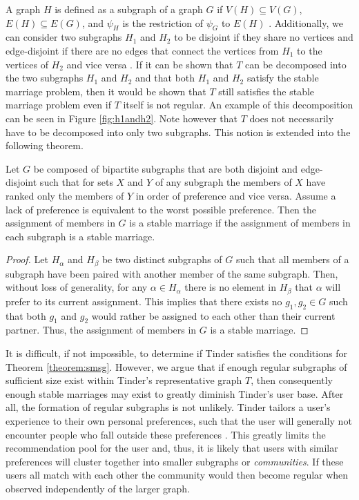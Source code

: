 A graph $H$ is defined as a subgraph of a graph $G$ if $V(H) \subseteq V(G)$, $E(H) \subseteq E(G)$, and $\psi_{H}$ is the restriction of $\psi_{G}$ to $E(H)$ \citep{Bondy1976}. Additionally, we can consider two subgraphs $H_{1}$ and $H_{2}$ to be disjoint if they share no vertices and edge-disjoint if there are no edges that connect the vertices from $H_{1}$ to the vertices of $H_{2}$ and vice versa \citep{Bondy1976}. If it can be shown that $T$ can be decomposed into the two subgraphs $H_{1}$ and $H_{2}$ and that both $H_{1}$ and $H_{2}$ satisfy the stable marriage problem, then it would be shown that $T$ still satisfies the stable marriage problem even if $T$ itself is not regular. An example of this decomposition can be seen in Figure \ref{fig:h1andh2}. Note however that $T$ does not necessarily have to be decomposed into only two subgraphs. This notion is extended into the following theorem.

\begin{theorem}
\label{theorem:smsg}
Let $G$ be composed of bipartite subgraphs that are both disjoint and edge-disjoint such that for sets $X$ and $Y$ of any subgraph the members of $X$ have ranked only the members of $Y$ in order of preference and vice versa. Assume a lack of preference is equivalent to the worst possible preference. Then the assignment of members in $G$ is a stable marriage if the assignment of members in each subgraph is a stable marriage.
\end{theorem}
\begin{proof}
Let $H_{\alpha}$ and $H_{\beta}$ be two distinct subgraphs of $G$ such that all members of a subgraph have been paired with another member of the same subgraph. Then, without loss of generality, for any $\alpha \in H_{\alpha}$ there is no element in $H_{\beta}$ that $\alpha$ will prefer to its current assignment. This implies that there exists no $g_{1}, g_{2} \in G$ such that both $g_{1}$ and $g_{2}$ would rather be assigned to each other than their current partner. Thus, the assignment of members in $G$ is a stable marriage.
\end{proof}

It is difficult, if not impossible, to determine if Tinder satisfies the conditions for Theorem \ref{theorem:smsg}. However, we argue that if enough regular subgraphs of sufficient size exist within Tinder's representative graph $T$, then consequently enough stable marriages may exist to greatly diminish Tinder's user base. After all, the formation of regular subgraphs is not unlikely. Tinder tailors a user's experience to their own personal preferences, such that the user will generally not encounter people who fall outside these preferences \citep{Courtois2018}. This greatly limits the recommendation pool for the user and, thus, it is likely that users with similar preferences will cluster together into smaller subgraphs or \textit{communities}. If these users all match with each other the community would then become regular when observed independently of the larger graph.

